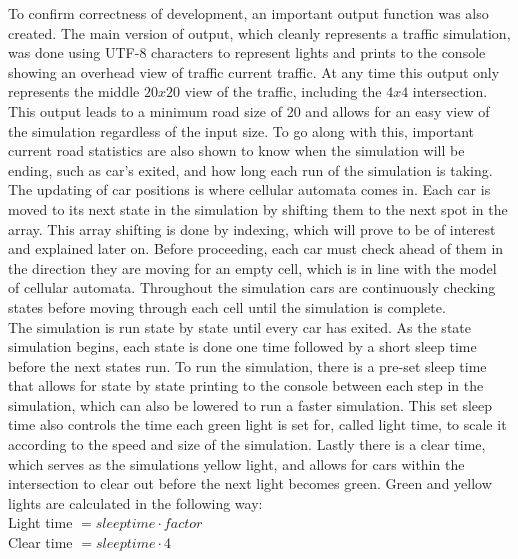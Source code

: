 \documentclass[conference]{IEEEtran}
\begin{document}
\hspace*{.2cm} To confirm correctness of development, an important output function was also created. The main version of output, which cleanly represents a traffic simulation, was done using UTF-8 characters to represent lights and prints to the console showing an overhead view of traffic current traffic. At any time this output only represents the middle $20x20$ view of the traffic, including the $4x4$ intersection. This output leads to a minimum road size of 20 and allows for an easy view of the simulation regardless of the input size. To go along with this, important current road statistics are also shown to know when the simulation will be ending, such as car's exited, and how long each run of the simulation is taking.  \\
\hspace*{.2cm} The updating of car positions is where cellular automata comes in. Each car is moved to its next state in the simulation by shifting them to the next spot in the array. This array shifting is done by indexing, which will prove to be of interest and explained later on. Before proceeding, each car must check ahead of them in the direction they are moving for an empty cell, which is in line with the model of cellular automata. Throughout the simulation cars are continuously checking states before moving through each cell until the simulation is complete. \\

\hspace*{.2cm}  The simulation is run state by state until every car has exited. As the state simulation begins, each state is done one time followed by a short sleep time before the next states run. To run the simulation, there is a pre-set sleep time that allows for state by state printing to the console between each step in the simulation, which can also be lowered to run a faster simulation. This set sleep time also controls the time each green light is set for, called light time, to scale it according to the speed and size of the simulation. Lastly there is a clear time, which serves as the simulations yellow light, and allows for cars within the intersection to clear out before the next light becomes green. Green and yellow lights are calculated in the following way: \\

Light time $= sleep time \cdot factor$ \\

Clear time $= sleep time \cdot 4$ \\
\end{document}
